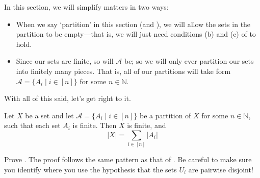 \rdefPartition*

In this section, we will simplify matters in two ways:
\begin{itemize}
\item When we say `partition' in this section (and ), we will allow the sets in the partition to be empty---that is, we will just need conditions (b) and (c) of  to hold.
\item Since our sets are finite, so will $\mathcal{A}$ be; so we will only ever partition our sets into finitely many pieces. That is, all of our partitions will take form $\mathcal{A} = \{ A_i \mid i \in [n] \}$ for some $n \in \mathbb{N}$.
\end{itemize}

With all of this said, let's get right to it.

\begin{theorem}
\label{thmAdditionPrinciple}
Let $X$ be a set and let $\mathcal{A} = \{ A_i \mid i \in [n] \}$ be a partition of $X$ for some $n \in \mathbb{N}$, such that each set $A_i$ is finite. Then $X$ is finite, and
\[ |X| = \sum_{i \in [n]} |A_i| \]
\end{theorem}

\begin{exercise}
Prove . The proof follows the same pattern as that of . Be careful to make sure you identify where you use the hypothesis that the sets $U_i$ are pairwise disjoint!
\end{exercise}

